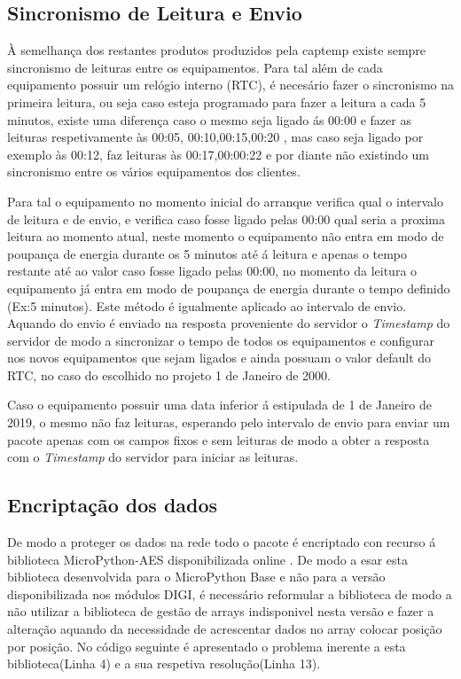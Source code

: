 \subsection {Sincronismo de Leitura e Envio} 

\par À semelhança dos restantes produtos produzidos pela captemp existe sempre sincronismo de leituras entre os equipamentos. Para tal além de cada equipamento possuir um relógio interno (RTC), é necesário fazer o sincronismo na primeira leitura, ou seja caso esteja programado para fazer a leitura a cada 5 minutos, existe uma diferença caso o mesmo seja ligado ás 00:00 e fazer as leituras respetivamente às 00:05, 00:10,00:15,00:20 , mas caso seja ligado por exemplo às 00:12, faz leituras às 00:17,00:00:22 e por diante não existindo um sincronismo entre os vários equipamentos dos clientes.
\par Para tal o equipamento no momento inicial do arranque verifica qual o intervalo de leitura e de envio, e verifica caso fosse ligado pelas 00:00 qual seria a proxima leitura ao momento atual, neste momento o equipamento não entra em modo de poupança de energia durante os 5 minutos até á leitura e apenas o tempo restante até ao valor caso fosse ligado pelas 00:00, no momento da leitura o equipamento já entra em modo de poupança de energia durante o tempo definido (Ex:5 minutos). Este método é igualmente aplicado ao intervalo de envio. Aquando do envio é enviado na resposta proveniente do servidor o \textit{Timestamp} do servidor de modo a sincronizar o tempo de todos os equipamentos e configurar nos novos equipamentos que sejam ligados e ainda possuam o valor default do RTC, no caso do escolhido no projeto 1 de Janeiro de 2000.
\par Caso o equipamento possuir uma data inferior á estipulada de 1 de Janeiro de 2019, o mesmo não faz leituras, esperando pelo intervalo de envio para enviar um pacote apenas com os campos fixos e sem leituras de modo a obter a resposta com o \textit{Timestamp} do servidor para iniciar as leituras.


\subsection {Encriptação dos dados}

\par De modo a proteger os dados na rede todo o pacote é encriptado con recurso á biblioteca MicroPython-AES disponibilizada online \cite{microaes}. De modo a esar esta biblioteca desenvolvida para o MicroPython Base e não para a versão disponibilizada nos módulos DIGI, é necessário reformular a biblioteca de modo a  não utilizar a biblioteca de gestão de arrays  indisponivel nesta versão e fazer a alteração aquando da necessidade de acrescentar dados no array colocar posição por posição.  No código seguinte é apresentado o problema inerente a esta biblioteca(Linha 4) e a sua respetiva resolução(Linha 13).


